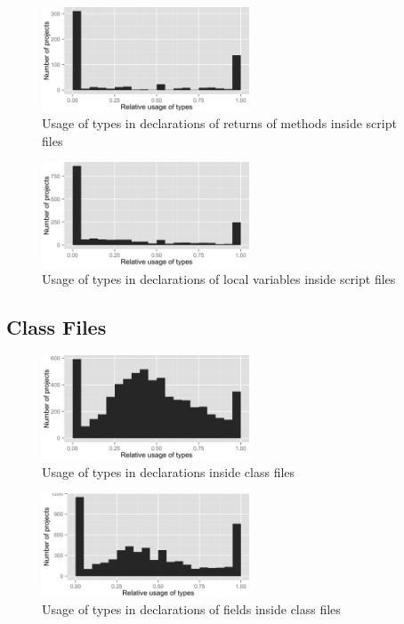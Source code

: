 \begin{figure}[h]
\centering 
\includegraphics[width=0.55\textwidth]{../aosd_2014/analysis/result/script/script/histograms/7_Method_Return.png} 
\caption{Usage of types in declarations of returns of methods inside script files}
\end{figure}

\begin{figure}[h]
\centering 
\includegraphics[width=0.55\textwidth]{../aosd_2014/analysis/result/script/script/histograms/6_Local_Variable.png} 
\caption{Usage of types in declarations of local variables inside script files}
\end{figure}

\FloatBarrier

\subsection*{Class Files}

\begin{figure}[h]
\centering 
\includegraphics[width=0.55\textwidth]{../aosd_2014/analysis/result/script/class/histograms/5_all_types.png} 
\caption{Usage of types in declarations inside class files}
\end{figure}

\begin{figure}[h]
\centering 
\includegraphics[width=0.55\textwidth]{../aosd_2014/analysis/result/script/class/histograms/10_Field.png} 
\caption{Usage of types in declarations of fields inside class files}
\end{figure}

